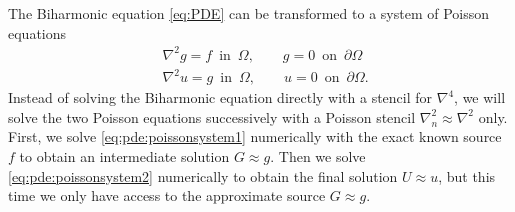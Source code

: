 The Biharmonic equation \ref{eq:PDE} can be transformed to a system of Poisson equations
\begin{subequations}\label{eq:PDE-poisson}
\begin{align}
	&\nabla^2 g = f \,\,\, \text{in} \,\,\, \Omega, \qquad g = 0 \,\,\, \text{on} \,\,\, \partial\Omega  \label{eq:pde:poissonsystem1} \\
	&\nabla^2 u = g \,\,\, \text{in} \,\,\, \Omega, \qquad u = 0 \,\,\, \text{on} \,\,\, \partial\Omega. \label{eq:pde:poissonsystem2}
\end{align}
\end{subequations}
Instead of solving the Biharmonic equation directly with a stencil for $\nabla^4$, we will solve the two Poisson equations successively with a Poisson stencil $\nabla_n^2 \approx \nabla^2$ only.
First, we solve \ref{eq:pde:poissonsystem1} numerically with the exact known source $f$ to obtain an intermediate solution $G \approx g$.
Then we solve \ref{eq:pde:poissonsystem2} numerically to obtain the final solution $U \approx u$, but this time we only have access to the approximate source $G \approx g$.

